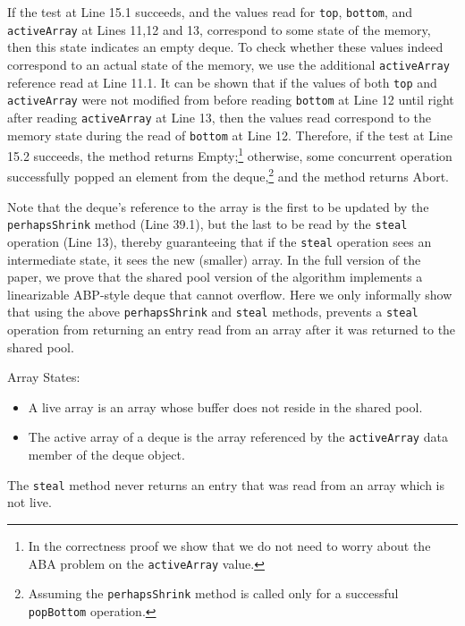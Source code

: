 If the test at Line 15.1 succeeds, and the values read for
\lstinline!top!, \lstinline!bottom!, and \lstinline!activeArray! at
Lines 11,12 and 13, correspond to some state of the memory, then this
state indicates an empty deque. To check whether these values indeed
correspond to an actual state of the memory, we use the additional
\lstinline!activeArray! reference read at Line 11.1. It can be shown
that if the values of both \lstinline!top! and \lstinline!activeArray!
were not modified from before reading \lstinline!bottom! at Line 12
until right after reading \lstinline!activeArray! at Line 13, then the
values read correspond to the memory state during the read of
\lstinline!bottom! at Line 12. Therefore, if the test at Line 15.2
succeeds, the method returns Empty;\footnote{In the correctness proof
  we show that we do not need to worry about the ABA problem on the
  \lstinline!activeArray! value.} otherwise, some concurrent operation
successfully popped an element from the deque,\footnote{Assuming the
  \lstinline!perhapsShrink! method is called only for a successful
  \lstinline!popBottom! operation.} and the method returns Abort.

Note that the deque's reference to the array is the first to be
updated by the \lstinline!perhapsShrink! method (Line 39.1), but the
last to be read by the \lstinline!steal! operation (Line 13), thereby
guaranteeing that if the \lstinline!steal! operation sees an
intermediate state, it sees the new (smaller) array. In the full
version of the paper, we prove that the shared pool version of the
algorithm implements a linearizable ABP-style deque that cannot
overflow. Here we only informally show that using the above
\lstinline!perhapsShrink! and \lstinline!steal! methods, prevents a
\lstinline!steal! operation from returning an entry read from an array
after it was returned to the shared pool.

\begin{definition}
  Array States:
  \begin{itemize}
  \item A live array is an array whose buffer does not reside in the
    shared pool.
  \item The active array of a deque is the array referenced by the
    \lstinline!activeArray! data member of the deque object.
  \end{itemize}
\end{definition}

\begin{lemma}
  The \lstinline!steal! method never returns an entry that was read
  from an array which is not live.
\end{lemma}

